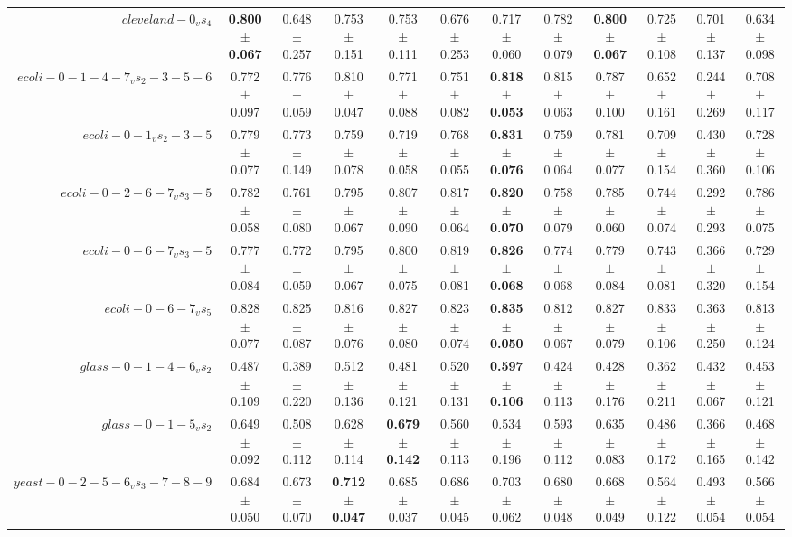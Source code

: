 \begin{table}[!ht]
{\begin{tabular}{r c c c c c c c c c c c}
$cleveland-0_vs_4$ & \textbf{0.800 $\pm$ 0.067} & 0.648 $\pm$ 0.257 & 0.753 $\pm$ 0.151 & 0.753 $\pm$ 0.111 & 0.676 $\pm$ 0.253 & 0.717 $\pm$ 0.060 & 0.782 $\pm$ 0.079 & \textbf{0.800 $\pm$ 0.067} & 0.725 $\pm$ 0.108 & 0.701 $\pm$ 0.137 & 0.634 $\pm$ 0.098 \\
$ecoli-0-1-4-7_vs_2-3-5-6$ & 0.772 $\pm$ 0.097 & 0.776 $\pm$ 0.059 & 0.810 $\pm$ 0.047 & 0.771 $\pm$ 0.088 & 0.751 $\pm$ 0.082 & \textbf{0.818 $\pm$ 0.053} & 0.815 $\pm$ 0.063 & 0.787 $\pm$ 0.100 & 0.652 $\pm$ 0.161 & 0.244 $\pm$ 0.269 & 0.708 $\pm$ 0.117 \\
$ecoli-0-1_vs_2-3-5$ & 0.779 $\pm$ 0.077 & 0.773 $\pm$ 0.149 & 0.759 $\pm$ 0.078 & 0.719 $\pm$ 0.058 & 0.768 $\pm$ 0.055 & \textbf{0.831 $\pm$ 0.076} & 0.759 $\pm$ 0.064 & 0.781 $\pm$ 0.077 & 0.709 $\pm$ 0.154 & 0.430 $\pm$ 0.360 & 0.728 $\pm$ 0.106 \\
$ecoli-0-2-6-7_vs_3-5$ & 0.782 $\pm$ 0.058 & 0.761 $\pm$ 0.080 & 0.795 $\pm$ 0.067 & 0.807 $\pm$ 0.090 & 0.817 $\pm$ 0.064 & \textbf{0.820 $\pm$ 0.070} & 0.758 $\pm$ 0.079 & 0.785 $\pm$ 0.060 & 0.744 $\pm$ 0.074 & 0.292 $\pm$ 0.293 & 0.786 $\pm$ 0.075 \\
$ecoli-0-6-7_vs_3-5$ & 0.777 $\pm$ 0.084 & 0.772 $\pm$ 0.059 & 0.795 $\pm$ 0.067 & 0.800 $\pm$ 0.075 & 0.819 $\pm$ 0.081 & \textbf{0.826 $\pm$ 0.068} & 0.774 $\pm$ 0.068 & 0.779 $\pm$ 0.084 & 0.743 $\pm$ 0.081 & 0.366 $\pm$ 0.320 & 0.729 $\pm$ 0.154 \\
$ecoli-0-6-7_vs_5$ & 0.828 $\pm$ 0.077 & 0.825 $\pm$ 0.087 & 0.816 $\pm$ 0.076 & 0.827 $\pm$ 0.080 & 0.823 $\pm$ 0.074 & \textbf{0.835 $\pm$ 0.050} & 0.812 $\pm$ 0.067 & 0.827 $\pm$ 0.079 & 0.833 $\pm$ 0.106 & 0.363 $\pm$ 0.250 & 0.813 $\pm$ 0.124 \\
$glass-0-1-4-6_vs_2$ & 0.487 $\pm$ 0.109 & 0.389 $\pm$ 0.220 & 0.512 $\pm$ 0.136 & 0.481 $\pm$ 0.121 & 0.520 $\pm$ 0.131 & \textbf{0.597 $\pm$ 0.106} & 0.424 $\pm$ 0.113 & 0.428 $\pm$ 0.176 & 0.362 $\pm$ 0.211 & 0.432 $\pm$ 0.067 & 0.453 $\pm$ 0.121 \\
$glass-0-1-5_vs_2$ & 0.649 $\pm$ 0.092 & 0.508 $\pm$ 0.112 & 0.628 $\pm$ 0.114 & \textbf{0.679 $\pm$ 0.142} & 0.560 $\pm$ 0.113 & 0.534 $\pm$ 0.196 & 0.593 $\pm$ 0.112 & 0.635 $\pm$ 0.083 & 0.486 $\pm$ 0.172 & 0.366 $\pm$ 0.165 & 0.468 $\pm$ 0.142 \\
$yeast-0-2-5-6_vs_3-7-8-9$ & 0.684 $\pm$ 0.050 & 0.673 $\pm$ 0.070 & \textbf{0.712 $\pm$ 0.047} & 0.685 $\pm$ 0.037 & 0.686 $\pm$ 0.045 & 0.703 $\pm$ 0.062 & 0.680 $\pm$ 0.048 & 0.668 $\pm$ 0.049 & 0.564 $\pm$ 0.122 & 0.493 $\pm$ 0.054 & 0.566 $\pm$ 0.054 \\

\end{tabular}}
\end{table}
